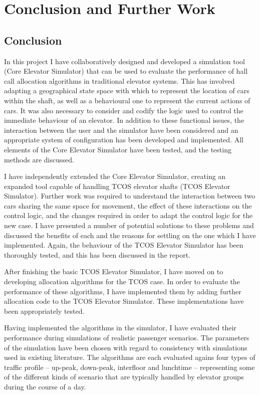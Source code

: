 \documentclass{UoYCSproject}
\begin{document}
\chapter{Conclusion and Further Work}

\section{Conclusion}

In this project I have collaboratively designed and developed a simulation tool (Core Elevator Simulator) that can be used to evaluate the performance of hall call allocation algorithms in traditional elevator systems.  This has involved adapting a geographical state space with which to represent the location of cars within the shaft, as well as a behavioural one to represent the current actions of cars.  It was also necessary to consider and codify the logic used to control the immediate behaviour of an elevator.  In addition to these functional issues, the interaction between the user and the simulator have been considered and an appropriate system of configuration has been developed and implemented.  All elements of the Core Elevator Simulator have been tested, and the testing methods are discussed.

I have independently extended the Core Elevator Simulator, creating an expanded tool capable of handling TCOS elevator shafts (TCOS Elevator Simulator).  Further work was required to understand the interaction between two cars sharing the same space for movement, the effect of these interactions on the control logic, and the changes required in order to adapt the control logic for the new case.  I have presented a number of potential solutions to these problems and discussed the benefits of each and the reasons for settling on the one which I have implemented.  Again, the behaviour of the TCOS Elevator Simulator has been thoroughly tested, and this has been discussed in the report.

After finishing the basic TCOS Elevator Simulator, I have moved on to developing allocation algorithms for the TCOS case.  In order to evaluate the performance of these algorithms, I have implemented them by adding further allocation code to the TCOS Elevator Simulator.  These implementations have been appropriately tested.

Having implemented the algorithms in the simulator, I have evaluated their performance during simulations of realistic passenger scenarios.  The parameters of the simulation have been chosen with regard to consistency with simulations used in existing literature.  The algorithms are each evaluated agains four types of traffic profile -- up-peak, down-peak, interfloor and lunchtime -- representing some of the different kinds of scenario that are typically handled by elevator groups during the course of a day.
\end{document}
